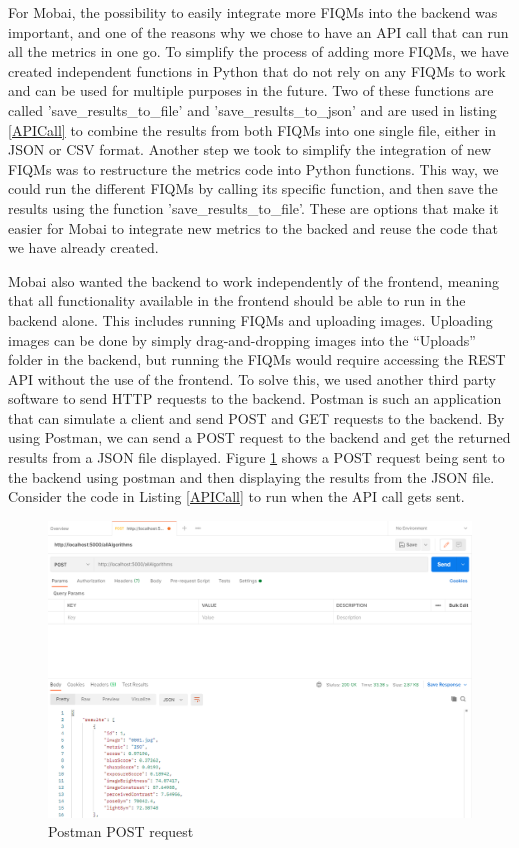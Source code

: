 For Mobai, the possibility to easily integrate more FIQMs into the backend was important, and one of the reasons why we chose to have an API call that can run all the metrics in one go. To simplify the process of adding more FIQMs, we have created independent functions in Python that do not rely on any FIQMs to work and can be used for multiple purposes in the future. Two of these functions are called 'save\_results\_to\_file' and 'save\_results\_to\_json' and are used in listing \ref{APICall} to combine the results from both FIQMs into one single file, either in JSON or CSV format. Another step we took to simplify the integration of new FIQMs was to restructure the metrics code into Python functions. This way, we could run the different FIQMs by calling its specific function, and then save the results using the function 'save\_results\_to\_file'. These are options that make it easier for Mobai to integrate new metrics to the backed and reuse the code that we have already created. 

Mobai also wanted the backend to work independently of the frontend, meaning that all functionality available in the frontend should be able to run in the backend alone. This includes running FIQMs and uploading images. Uploading images can be done by simply drag-and-dropping images into the ``Uploads'' folder in the backend, but running the FIQMs would require accessing the REST API without the use of the frontend. To solve this, we used another third party software to send HTTP requests to the backend. Postman is such an application that can simulate a client and send POST and GET requests to the backend. By using Postman, we can send a POST request to the backend and get the returned results from a JSON file displayed. Figure \ref{fig:postman} shows a POST request being sent to the backend using postman and then displaying the results from the JSON file. Consider the code in Listing \ref{APICall} to run when the API call gets sent. 
\newpage
%
\begin{figure}[h]
    \centering
    \includegraphics[scale=0.29]{figures/postman_json.PNG}
    \caption{Postman POST request}
    \label{fig:postman}
\end{figure}

